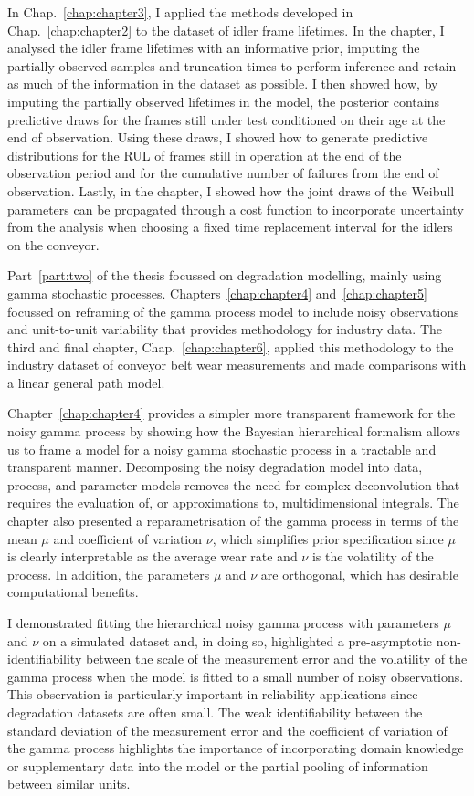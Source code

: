 In Chap.~\ref{chap:chapter3}, I applied the methods developed in Chap.~\ref{chap:chapter2} to the dataset of idler frame lifetimes. In the chapter, I analysed the idler frame lifetimes with an informative prior, imputing the partially observed samples and truncation times to perform inference and retain as much of the information in the dataset as possible. I then showed how, by imputing the partially observed lifetimes in the model, the posterior contains predictive draws for the frames still under test conditioned on their age at the end of observation. Using these draws, I showed how to generate predictive distributions for the RUL of frames still in operation at the end of the observation period and for the cumulative number of failures from the end of observation. Lastly, in the chapter, I showed how the joint draws of the Weibull parameters can be propagated through a cost function to incorporate uncertainty from the analysis when choosing a fixed time replacement interval for the idlers on the conveyor. 

Part~\ref{part:two} of the thesis focussed on degradation modelling, mainly using gamma stochastic processes. Chapters~\ref{chap:chapter4} and~\ref{chap:chapter5} focussed on reframing of the gamma process model to include noisy observations and unit-to-unit variability that provides methodology for industry data. The third and final chapter, Chap.~\ref{chap:chapter6}, applied this methodology to the industry dataset of conveyor belt wear measurements and made comparisons with a linear general path model.

Chapter~\ref{chap:chapter4} provides a simpler more transparent framework for the noisy gamma process by showing how the Bayesian hierarchical formalism allows us to frame a model for a noisy gamma stochastic process in a tractable and transparent manner. Decomposing the noisy degradation model into data, process, and parameter models removes the need for complex deconvolution that requires the evaluation of, or approximations to, multidimensional integrals. The chapter also presented a reparametrisation of the gamma process in terms of the mean $\mu$ and coefficient of variation $\nu$, which simplifies prior specification since $\mu$ is clearly interpretable as the average wear rate and $\nu$ is the volatility of the process. In addition, the parameters $\mu$ and $\nu$ are orthogonal, which has desirable computational benefits.

I demonstrated fitting the hierarchical noisy gamma process with parameters $\mu$ and $\nu$ on a simulated dataset and, in doing so, highlighted a pre-asymptotic non-identifiability between the scale of the measurement error and the volatility of the gamma process when the model is fitted to a small number of noisy observations. This observation is particularly important in reliability applications since degradation datasets are often small. The weak identifiability between the standard deviation of the measurement error and the coefficient of variation of the gamma process highlights the importance of incorporating domain knowledge or supplementary data into the model or the partial pooling of information between similar units.

